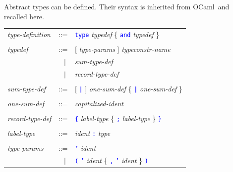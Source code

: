 \documentclass[11pt,titlepage,twoside]{report}
\newcommand{\ocaml}{{\sf OCaml}}
\newcommand{\alt}{\;|\;}
\newcommand{\term}[1]{\textcolor{Blue}{\tt #1}}
\newcommand{\nterm}[1]{\textcolor{BrickRed}{\it #1}}
\newcommand{\term}[1]{{\tt #1}}
\newcommand{\nterm}[1]{{\em #1}}
\begin{document}
Abstract types can be defined. Their syntax is inherited from \ocaml\
and recalled here.
\begin{center}
\begin{tabular}{lcl}
\nterm{type-definition} 
  & ::=    & \term{type} \nterm{typedef} 
             \{ \term{and} \nterm{typedef} \} 
\\ \\
\nterm{typedef}
  & ::=        & [ \nterm{type-params} ] \nterm{typeconstr-name} \\
  & $\;\;\alt$ & \nterm{sum-type-def} \\
  & $\;\;\alt$ & \nterm{record-type-def} 
\\ \\
\nterm{sum-type-def}
  & ::=        & [ \term{|} ] \nterm{one-sum-def} 
                 \{ \term{|} \nterm{one-sum-def} \} 
\\ \\
\nterm{one-sum-def}     
& ::=        & \nterm{capitalized-ident}
\\ \\
\nterm{record-type-def} 
  & ::=        & \term{\{} \nterm{label-type}
                 \{ \term{;} \nterm{label-type} \} \term{\}} 
\\ \\
\nterm{label-type}
  & ::=        & \nterm{ident} \term{:} \nterm{type} 
\\ \\
\nterm{type-params}
  & ::=        & \term{'} \nterm{ident} \\
  & $\;\;\alt$ & \term{(} \term{'} \nterm{ident} 
                 \{ \term{,} \term{'} \nterm{ident} \} \term{)}
\end{tabular}
\end{center}

\end{document}
